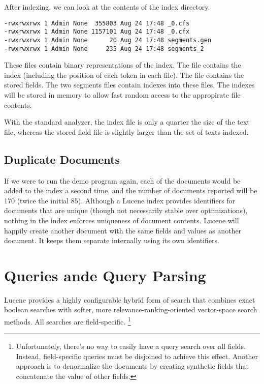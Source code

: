 After indexing, we can look at the contents of the index directory.
%
\begin{verbatim}
-rwxrwxrwx 1 Admin None  355803 Aug 24 17:48 _0.cfs
-rwxrwxrwx 1 Admin None 1157101 Aug 24 17:48 _0.cfx
-rwxrwxrwx 1 Admin None      20 Aug 24 17:48 segments.gen
-rwxrwxrwx 1 Admin None     235 Aug 24 17:48 segments_2
\end{verbatim}
%
These files contain binary representations of the index.  The
 file contains the index (including the position of each
token in each file).  The  file contains the stored fields. 
The two segments files contain indexes into these files.  The indexes
will be stored in memory to allow fast random access to the appropirate
file contents.

With the standard analyzer, the index file is only a quarter the size of
the text file, whereas the stored field file is slightly larger than the
set of texts indexed.

\subsection{Duplicate Documents}

If we were to run the demo program again, each of the documents would
be added to the index a second time, and the number of documents
reported will be 170 (twice the initial 85).  Although a Lucene index
provides identifiers for documents that are unique (though not
necessarily stable over optimizations), nothing in the index enforces
uniqueness of document contents.  Lucene will happily create another
document with the same fields and values as another document.  It
keeps them separate internally using its own identifiers.


\section{Queries ande Query Parsing}

Lucene provides a highly configurable hybrid form of search that
combines exact boolean searches with softer, more
relevance-ranking-oriented vector-space search methods.  All searches
are field-specific.
%
\footnote{Unfortunately, there's no way to easily have a query search
  over all fields.  Instead, field-specific queries must be disjoined
  to achieve this effect.  Another approach is to denormalize the
  documents by creating synthetic fields that concatenate the value of
  other fields.}

